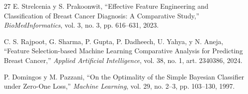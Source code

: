 \documentclass[journal]{IEEEtran}
\begin{document}
\begin{thebibliography}{27}
E. Strelcenia y S. Prakoonwit, ``Effective Feature Engineering and Classification of Breast Cancer Diagnosis: A Comparative Study,'' \textit{BioMedInformatics}, vol. 3, no. 3, pp. 616--631, 2023.

C. S. Rajpoot, G. Sharma, P. Gupta, P. Dadheech, U. Yahya, y N. Aneja, ``Feature Selection-based Machine Learning Comparative Analysis for Predicting Breast Cancer,'' \textit{Applied Artificial Intelligence}, vol. 38, no. 1, art. 2340386, 2024.

P. Domingos y M. Pazzani, ``On the Optimality of the Simple Bayesian Classifier under Zero-One Loss,'' \textit{Machine Learning}, vol. 29, no. 2--3, pp. 103--130, 1997.

\end{thebibliography}
\end{document}
